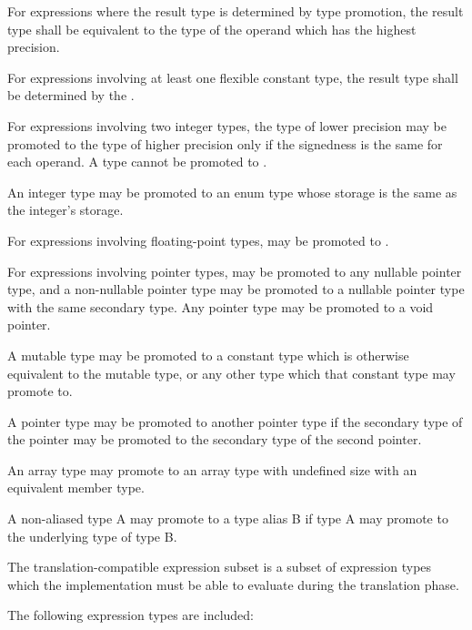 \specsubitem
For expressions where the result type is determined by type promotion, the
result type shall be equivalent to the type of the operand which has the
highest precision.

\specsubitem
For expressions involving at least one flexible constant type, the result type
shall be determined by the .

\specsubitem
For expressions involving two integer types, the type of lower precision may be
promoted to the type of higher precision only if the signedness is the same for
each operand. A type cannot be promoted to .

\specsubitem
An integer type may be promoted to an enum type whose storage is the
same as the integer's storage.

\specsubitem
For expressions involving floating-point types,  may be promoted
to .

\specsubitem
For expressions involving pointer types,  may be promoted to any
nullable pointer type, and a non-nullable pointer type may be promoted to
a nullable pointer type with the same secondary type. Any pointer type may be
promoted to a void pointer.

\specsubitem
A mutable type may be promoted to a constant type which is otherwise equivalent
to the mutable type, or any other type which that constant type may promote to.

\specsubitem
A pointer type may be promoted to another pointer type if the secondary type of
the pointer may be promoted to the secondary type of the second pointer.

\specsubitem
An array type may promote to an array type with undefined size with an
equivalent member type.

\specsubitem
A non-aliased type A may promote to a type alias B if type A may promote to the
underlying type of type B.


The translation-compatible expression subset is a subset of expression types
which the implementation must be able to evaluate during the translation phase.

\specsubitem
The following expression types are included:

